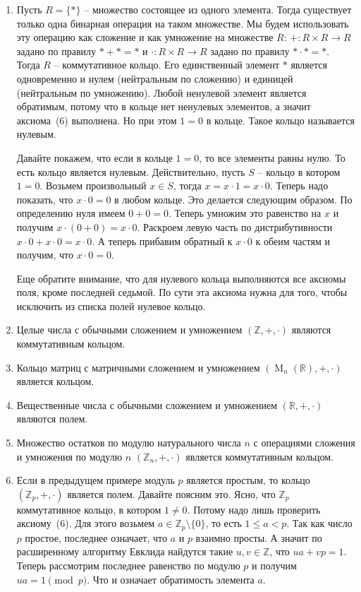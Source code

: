 \begin{examples}
\begin{enumerate}
\item Пусть $R = \{*\}$ -- множество состоящее из одного элемента.
Тогда существует только одна бинарная операция на таком множестве.
Мы будем использовать эту операцию как сложение и как умножение на множестве $R$: $+\colon R\times R\to R$ задано по правилу $* + * = *$ и $\cdot \colon R\times R\to R$ задано по правилу $* \cdot * = *$.
Тогда $R$ -- коммутативное кольцо.
Его единственный элемент $*$ является одновременно и нулем (нейтральным по сложению) и единицей (нейтральным по умножению).
Любой ненулевой элемент является обратимым, потому что в кольце нет ненулевых элементов, а значит аксиома~(6) выполнена.
Но при этом $1 = 0$ в кольце.
Такое кольцо называется нулевым.

Давайте покажем, что если в кольце $1 = 0$, то все элементы равны нулю.
То есть кольцо является нулевым.
Действительно, пусть $S$ -- кольцо в котором $1 = 0$.
Возьмем произвольный $x\in S$, тогда $x = x \cdot 1 = x \cdot 0$.
Теперь надо показать, что $x \cdot 0 = 0$ в любом кольце.
Это делается следующим образом.
По определению нуля имеем $0 + 0 = 0$.
Теперь умножим это равенство на $x$ и получим $x\cdot (0 + 0) = x \cdot 0$.
Раскроем левую часть по дистрибутивности $x \cdot 0 + x\cdot 0 = x\cdot 0$.
А теперь прибавим обратный к $x \cdot 0$ к обеим частям и получим, что $ x\cdot 0 = 0$.

Еще обратите внимание, что для нулевого кольца выполняются все аксиомы поля, кроме последней седьмой.
По сути эта аксиома нужна для того, чтобы исключить из списка полей нулевое кольцо.

\item Целые числа с обычными сложением и умножением $(\mathbb Z, +, \cdot)$ являются коммутативным кольцом.

\item Кольцо матриц с матричными сложением и умножением $(\operatorname{M}_n(\mathbb R), +, \cdot)$ является кольцом.

\item Вещественные числа с обычными сложением и умножением $(\mathbb R, +, \cdot)$ являются полем.

\item Множество остатков по модулю натурального числа $n$ с операциями сложения и умножения по модулю $n$ $(\mathbb Z_n, +, \cdot)$ является коммутативным кольцом.

\item Если в предыдущем примере модуль $p$ является простым, то кольцо $(\mathbb Z_p, +,\cdot)$ является полем.
Давайте поясним это.
Ясно, что $\mathbb Z_p$ коммутативное кольцо, в котором $1 \neq 0$.
Потому надо лишь проверить аксиому~(6).
Для этого возьмем $a\in \mathbb Z_p\setminus\{0\}$, то есть $1 \leqslant a < p$.
Так как число $p$ простое, последнее означает, что $a$ и $p$ взаимно просты.
А значит по расширенному алгоритму Евклида найдутся такие $u, v\in \mathbb Z$, что $u a + v p = 1$.
Теперь рассмотрим последнее равенство по модулю $p$ и получим $u a = 1 \pmod p$.
Что и означает обратимость элемента $a$.


\end{enumerate}
\end{examples}
